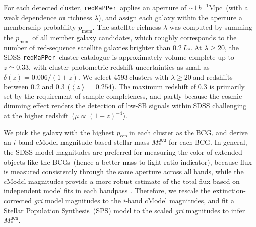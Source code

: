 \documentclass[fleqn,usenatbib]{mnras}
\newcommand{\avg}[1]{\left\langle #1 \right\rangle}
\newcommand{\msbcg}{M_*^{\texttt{BCG}}}
\newcommand{\hmpc}{h^{-1}\mathrm{Mpc}}
\newcommand{\pcen}{p_{\mathrm{cen}}}
\newcommand{\pmem}{p_{\mathrm{mem}}}
\newcommand\redmapper{\texttt{redMaPPer}}
\begin{document}
For each detected cluster, \redmapper~applies an aperture of
${\sim}1\,\hmpc$~(with a weak dependence on richness $\lambda$), and assign
each galaxy within the aperture a membership probability $\pmem$. The
satellite richness $\lambda$ was computed by summing the $\pmem$ of all
member galaxy candidates, which roughly corresponds to the number of
red-sequence satellite galaxies brighter than $0.2\,L_*$. At
$\lambda{\geq}20$, the SDSS \redmapper~cluster catalogue is approximately
volume-complete up to $z{\simeq}0.33$, with cluster photometric redshift
uncertainties as small as $\delta(z){=}0.006/(1+z)$.  We select $4593$
clusters with $\lambda{\geq}20$ and redshifts between $0.2$ and
$0.3$~($\avg{z}{=}0.254$). The maximum redshift of $0.3$ is primarily set
by the requirement of sample completeness, and partly because the cosmic
dimming effect renders the detection of low-SB signals within SDSS
challenging at the higher redshift~($\mu \propto (1+z)^{-4}$).


We pick the galaxy with the highest $\pcen$ in each cluster as the BCG, and
derive an $i$-band cModel magnitude-based stellar mass $\msbcg$ for each
BCG.  In general, the SDSS model magnitudes are preferred for measuring the
color of extended objects like the BCGs~(hence a better mass-to-light ratio
indicator), because flux is measured consistently through the same aperture
across all bands, while the cModel magnitudes provide a more robust
estimate of the total flux based on independent model fits in each
bandpass~\citep[but see][]{Bernardi2017}. Therefore, we rescale the extinction-corrected {\it gri} model magnitudes to the $i$-band cModel magnitudes, and fit a Stellar Population
Synthesis~(SPS) model to the scaled {\it gri} magnitudes
to infer $\msbcg$.
\end{document}
